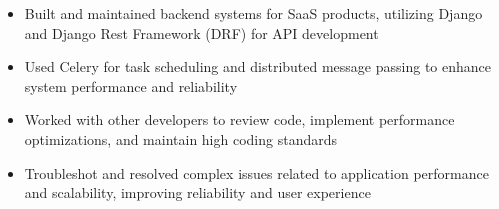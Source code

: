\par\bigskip
{}
\par\smallskip
\begin{minipage}{13.75cm}
  \begin{minipage}{6.5cm}
    \begin{itemize}
      \item Built and maintained backend systems for SaaS products, utilizing Django and Django Rest Framework (DRF) for API development
      \item Used Celery for task scheduling and distributed message passing to enhance system performance and reliability
    \end{itemize}
  \end{minipage}
  \hfill
  \begin{minipage}{6.5cm}
    \begin{itemize}
      \item Worked with other developers to review code, implement performance optimizations, and maintain high coding standards
      \item Troubleshot and resolved complex issues related to application performance and scalability, improving reliability and user experience
    \end{itemize}
  \end{minipage}
\end{minipage}
\par\smallskip
\divider

